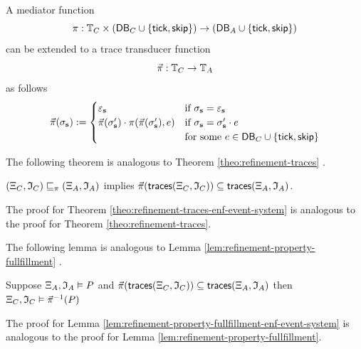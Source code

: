 \begin{definition}
    \label{def:mediator-function-trace-extension}
    A mediator function
    $$\pi : \mathbb{T}_C \times (\mathsf{DB}_C \cup \{ \mathsf{tick}, \mathsf{skip} \})
    \to (\mathsf{DB}_A \cup \{ \mathsf{tick}, \mathsf{skip} \})$$
    can be extended to a trace transducer function
    $$\vec{\pi} : \mathbb{T}_C \to \mathbb{T}_A$$
    as follows
    \begin{align*}
        \vec{\pi}(\sigma_{\mathbf{s}}) :=
        \begin{cases}
            \varepsilon_{\mathbf{s}} &\text{if } \sigma_{\mathbf{s}} = \varepsilon_{\mathbf{s}} \\
            \vec{\pi}(\sigma_{\mathbf{s}}') \cdot \pi(\vec{\pi}(\sigma_{\mathbf{s}}'), e)
                &\text{if } \sigma_{\mathbf{s}} = \sigma_{\mathbf{s}}' \cdot e \\
                &\text{for some } e \in \mathsf{DB}_C \cup \{\mathsf{tick}, \mathsf{skip} \}
        \end{cases}
    \end{align*}
\end{definition}

The following theorem is analogous to
Theorem \ref{theo:refinement-traces}
\cite[Theorem 2.1]{igloo}.
\begin{theorem}
    \label{theo:refinement-traces-enf-event-system}
    $(\Xi_C, \mathfrak{I}_C) \sqsubseteq_\pi (\Xi_A, \mathfrak{I}_A)$
    implies
    $\vec{\pi}(\mathsf{traces}(\Xi_C, \mathfrak{I}_C)) \subseteq
    \mathsf{traces}(\Xi_A, \mathfrak{I}_A)$.
\end{theorem}
The proof for Theorem \ref{theo:refinement-traces-enf-event-system} is
analogous to the proof for Theorem \ref{theo:refinement-traces}.

The following lemma is analogous to
Lemma \ref{lem:refinement-property-fullfillment}
\cite[Lemma 2.2]{igloo}.
\begin{lemma}
    \label{lem:refinement-property-fullfillment-enf-event-system}
    Suppose 
    $\Xi_A, \mathfrak{I}_A \vDash P$
    and
    $\vec{\pi}(\mathsf{traces}(\Xi_C, \mathfrak{I}_C)) \subseteq
    \mathsf{traces}(\Xi_A, \mathfrak{I}_A)$
    then
    $\Xi_C, \mathfrak{I}_C \vDash \vec{\pi}^{-1}(P)$
\end{lemma}
The proof for Lemma \ref{lem:refinement-property-fullfillment-enf-event-system}
is analogous to the proof for Lemma \ref{lem:refinement-property-fullfillment}.


